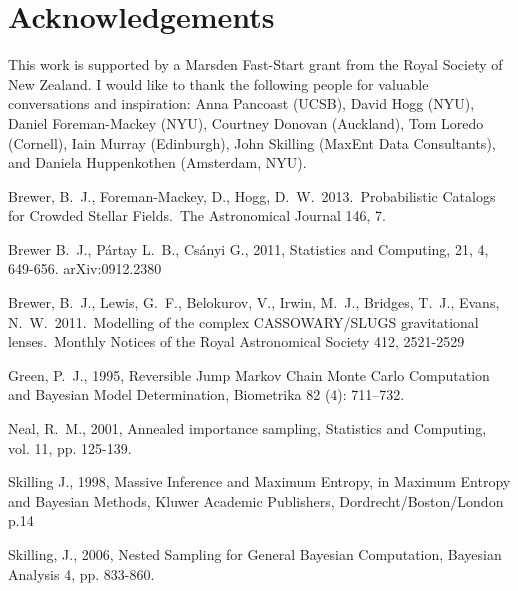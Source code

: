 \documentclass[letterpaper, 11pt]{article}
\begin{document}




\section*{Acknowledgements}
This work is supported by a Marsden Fast-Start grant
from the Royal Society of New Zealand. I would like to thank the following
people for valuable conversations and inspiration:
Anna Pancoast (UCSB), David Hogg (NYU), Daniel Foreman-Mackey (NYU),
Courtney Donovan (Auckland), Tom Loredo (Cornell), Iain Murray (Edinburgh),
John Skilling (MaxEnt Data Consultants), and Daniela Huppenkothen
(Amsterdam, NYU).


\begin{thebibliography}{}

 Brewer, B.~J., 
Foreman-Mackey, D., Hogg, D.~W.\ 2013.\ Probabilistic Catalogs for Crowded 
Stellar Fields.\ The Astronomical Journal 146, 7. 

 Brewer B.~J., P{\'a}rtay L.~B., Cs{\'a}nyi G., 2011,
Statistics and Computing, 21, 4, 649-656. arXiv:0912.2380

 Brewer, B.~J., Lewis,
G.~F., Belokurov, V., Irwin, M.~J., Bridges, T.~J., Evans, N.~W.\ 2011.\
Modelling of the complex CASSOWARY/SLUGS gravitational lenses.\ Monthly
Notices of the Royal Astronomical Society 412, 2521-2529

Green, P.~J., 1995, Reversible Jump Markov Chain Monte Carlo Computation and Bayesian Model Determination, Biometrika 82 (4): 711–732.

 Neal, R.~M., 2001, 
Annealed importance sampling, Statistics and Computing, vol. 11, pp. 125-139.

Skilling J., 1998, Massive Inference and Maximum Entropy, in Maximum Entropy
and Bayesian Methods, Kluwer Academic Publishers, Dordrecht/Boston/London p.14

 Skilling, J., 2006, Nested Sampling for General Bayesian Computation, Bayesian Analysis 4, pp. 833-860.


\end{thebibliography}
\end{document}
